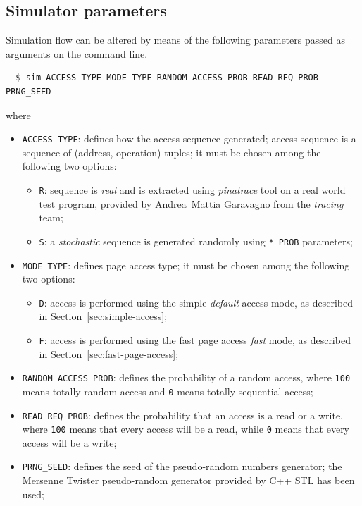 \documentclass[a4paper,12pt]{article}
\begin{document}
\subsection{Simulator parameters}
Simulation flow can be altered by means of the following parameters passed as arguments on the command line.

\begin{verbatim}
  $ sim ACCESS_TYPE MODE_TYPE RANDOM_ACCESS_PROB READ_REQ_PROB PRNG_SEED
\end{verbatim}

where

\begin{itemize}
  \item \texttt{ACCESS\_TYPE}: defines how the access sequence generated; access sequence is a sequence of (address, operation) tuples; it must be chosen among the following two options:
  \begin{itemize}
    \item \texttt{R}: sequence is \emph{real} and is extracted using \emph{pinatrace} tool on a real world test program, provided by Andrea~Mattia Garavagno from the \emph{tracing} team;
    \item \texttt{S}: a \emph{stochastic} sequence is generated randomly using \texttt{*\_PROB} parameters;
  \end{itemize}
  \item \texttt{MODE\_TYPE}: defines page access type; it must be chosen among the following two options:
\begin{itemize}
  \item \texttt{D}: access is performed using the simple \emph{default} access mode, as described in Section~\ref{sec:simple-access};
  \item \texttt{F}: access is performed using the fast page access \emph{fast} mode, as described in Section~\ref{sec:fast-page-access};
\end{itemize}
  \item \texttt{RANDOM\_ACCESS\_PROB}: defines the probability of a random access, where \texttt{100} means totally random access and \texttt{0} means totally sequential access;
  \item \texttt{READ\_REQ\_PROB}: defines the probability that an access is a read or a write, where \texttt{100} means that every access will be a read, while \texttt{0} means that every access will be a write;
  \item \texttt{PRNG\_SEED}: defines the seed of the pseudo-random numbers generator; the Mersenne Twister pseudo-random generator provided by C++ STL has been used;
\end{itemize}
\end{document}
